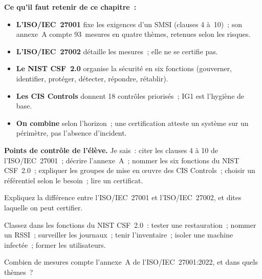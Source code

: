 \begin{boxresume}
\textbf{Ce qu'il faut retenir de ce chapitre~:}
\begin{itemize}
    \item \textbf{L'ISO/IEC~27001} fixe les exigences d'un SMSI (clauses 4
          à~10)~; son annexe~A compte 93~mesures en quatre thèmes,
          retenues selon les risques.
    \item \textbf{L'ISO/IEC~27002} détaille les mesures~; elle ne se
          certifie pas.
    \item \textbf{Le NIST CSF~2.0} organise la sécurité en six fonctions
          (gouverner, identifier, protéger, détecter, répondre, rétablir).
    \item \textbf{Les CIS Controls} donnent 18 contrôles priorisés~; IG1 est
          l'hygiène de base.
    \item \textbf{On combine} selon l'horizon~; une certification atteste
          un système sur un périmètre, pas l'absence d'incident.
\end{itemize}
\end{boxresume}

\begin{boxinfo}
\textbf{Points de contrôle de l'élève.} Je sais~: citer les clauses 4 à
10 de l'ISO/IEC~27001~; décrire l'annexe~A~; nommer les six fonctions du
NIST CSF~2.0~; expliquer les groupes de mise en œuvre des CIS Controls~;
choisir un référentiel selon le besoin~; lire un certificat.
\end{boxinfo}

\bigskip

\begin{boxexo}[title={\ding{45}\quad Exercice~10.1. Exigence ou recommandation \niveaubase}]
Expliquez la différence entre l'ISO/IEC~27001 et l'ISO/IEC~27002, et
dites laquelle on peut certifier.
\end{boxexo}

\begin{boxexo}[title={\ding{45}\quad Exercice~10.2. Les fonctions \niveaubase}]
Classez dans les fonctions du NIST CSF~2.0~: tester une restauration~;
nommer un RSSI~; surveiller les journaux~; tenir l'inventaire~; isoler
une machine infectée~; former les utilisateurs.
\end{boxexo}

\begin{boxexo}[title={\ding{45}\quad Exercice~10.3. Annexe A \niveaubase}]
Combien de mesures compte l'annexe~A de l'ISO/IEC~27001:2022, et dans
quels thèmes~?
\end{boxexo}

